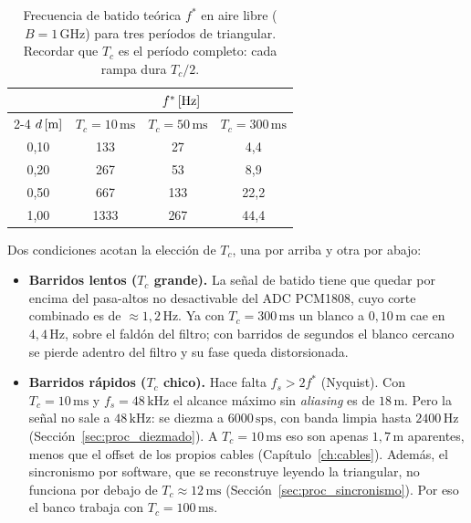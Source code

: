 \documentclass[12pt, a4paper, twoside]{report}
\begin{document}
\begin{table}[H]
  \centering
  \caption{Frecuencia de batido teórica $f^*$ en aire libre
    ($B = 1\,\text{GHz}$) para tres períodos de triangular. Recordar que
  $T_c$ es el período completo: cada rampa dura $T_c/2$.}
  \label{tab:prueba_metalica}
  \begin{tabular}{cccc}
    \toprule
    & \multicolumn{3}{c}{$f^*\,\textnormal{[Hz]}$} \\
    \cmidrule(l){2-4}
    $d\,\textnormal{[m]}$ & $T_c = 10\,\text{ms}$ & $T_c = 50\,\text{ms}$
    & $T_c = 300\,\text{ms}$ \\
    \midrule
    0{,}10 &  133 &  27 &  4{,}4 \\
    0{,}20 &  267 &  53 &  8{,}9 \\
    0{,}50 &  667 & 133 & 22{,}2 \\
    1{,}00 & 1333 & 267 & 44{,}4 \\
    \bottomrule
  \end{tabular}
\end{table}

Dos condiciones acotan la elección de $T_c$, una por arriba y otra por abajo:

\begin{itemize}
  \item \textbf{Barridos lentos ($T_c$ grande).} La señal de batido tiene que
    quedar por encima del pasa-altos no desactivable del ADC PCM1808, cuyo corte
    combinado es de $\approx 1{,}2\,\text{Hz}$. Ya con
    $T_c = 300\,\text{ms}$ un blanco a $0{,}10\,\text{m}$ cae en
    $4{,}4\,\text{Hz}$, sobre el faldón del filtro; con barridos de segundos el
    blanco cercano se pierde adentro del filtro y su fase queda distorsionada.
  \item \textbf{Barridos rápidos ($T_c$ chico).} Hace falta $f_s > 2f^*$
    (Nyquist). Con $T_c = 10\,\text{ms}$ y $f_s = 48\,\text{kHz}$ el alcance
    máximo sin \textit{aliasing} es de $18\,\text{m}$. Pero la señal no sale
    a $48\,\text{kHz}$: se diezma a $6000\,\text{sps}$, con banda limpia
    hasta $2400\,\text{Hz}$ (Sección~\ref{sec:proc_diezmado}). A
    $T_c = 10\,\text{ms}$ eso son apenas $1{,}7\,\text{m}$ aparentes, menos
    que el offset de los propios cables (Capítulo~\ref{ch:cables}). Además,
    el sincronismo por software, que se reconstruye leyendo la triangular,
    no funciona por debajo de $T_c \approx 12\,\text{ms}$
    (Sección~\ref{sec:proc_sincronismo}). Por eso el banco trabaja con
    $T_c = 100\,\text{ms}$.
\end{itemize}
\end{document}
